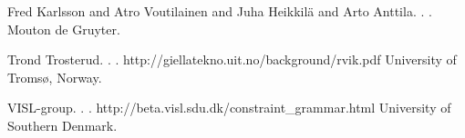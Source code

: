 \documentclass[11pt]{article}
\begin{document}
\begin{thebibliography}{}
{Fred Karlsson and Atro Voutilainen and Juha Heikkilä and Arto Anttila}.
.
.
\newblock Mouton de Gruyter.




{Trond Trosterud}.
.
.
\newblock http://giellatekno.uit.no/background/rvik.pdf
\newblock University of Tromsø, Norway.

{VISL-group}.
.
.
\newblock http://beta.visl.sdu.dk/constraint\_grammar.html
\newblock University of Southern Denmark.


\end{thebibliography}


%
%



	
\end{document}

